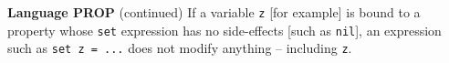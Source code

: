 \begin{minipage}[t]{\sw}
\slidenumber
\LARGE
{\bf Language PROP} (continued)\exx
If a variable \verb'z' [for example] is bound to a property
whose \verb'set' expression has no side-effects [such as \verb'nil'],
an expression such as \verb'set z = ...' does not modify anything --
including \verb'z'.
\Large
{}
\end{minipage}
